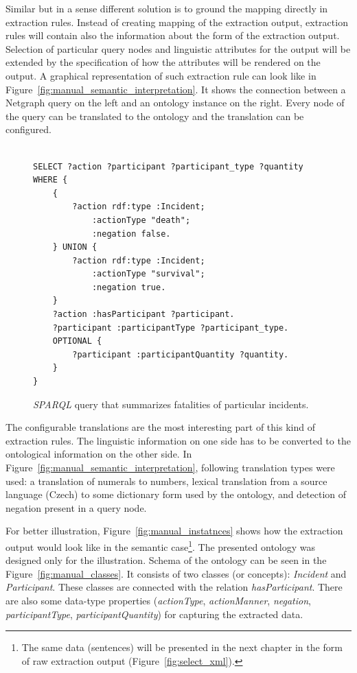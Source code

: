Similar but in a sense different solution is to ground the mapping directly in extraction rules. Instead of creating mapping of the extraction output, extraction rules will contain also the information about the form of the extraction output. Selection of particular query nodes and linguistic attributes for the output will be extended by the specification of how the attributes will be rendered on the output. A graphical representation of such extraction rule can look like in Figure~\ref{fig:manual_semantic_interpretation}. It shows the connection between a Netgraph query on the left and an ontology instance on the right. Every node of the query can be translated to the ontology and the translation can be configured. 


\begin{figure}[b!]
\begin{verbatim}

SELECT ?action ?participant ?participant_type ?quantity
WHERE {
	{
		?action rdf:type :Incident;
			:actionType "death";
			:negation false.
	} UNION {
		?action rdf:type :Incident;
			:actionType "survival";
			:negation true.
	}
	?action :hasParticipant ?participant.
	?participant :participantType ?participant_type.
	OPTIONAL {
		?participant :participantQuantity ?quantity.
	}
}
\end{verbatim}
\caption{\emph{SPARQL} query that summarizes fatalities of particular incidents.}
\label{fig:sparql_aggregation}
\end{figure}


The configurable translations are the most interesting part of this kind of extraction rules. The linguistic information on one side has to be converted to the ontological information on the other side. In Figure~\ref{fig:manual_semantic_interpretation}, following translation types were used: a translation of numerals to numbers, lexical translation from a source language (Czech) to some dictionary form used by the ontology, and detection of negation present in a query node.

For better illustration, Figure~\ref{fig:manual_instatnces} shows how the extraction output would look like in the semantic case\footnote{The same data (sentences) will be presented in the next chapter in the form of raw extraction output (Figure~\ref{fig:select_xml}).}. The presented ontology was designed only for the illustration. Schema of the ontology can be seen in the Figure~\ref{fig:manual_classes}. It consists of two classes (or concepts): \emph{Incident} and \emph{Participant}. These classes are connected with the relation \emph{hasParticipant}. There are also some data-type properties (\emph{actionType}, \emph{actionManner}, \emph{negation}, \emph{participantType}, \emph{participantQuantity}) for capturing the extracted data. 

